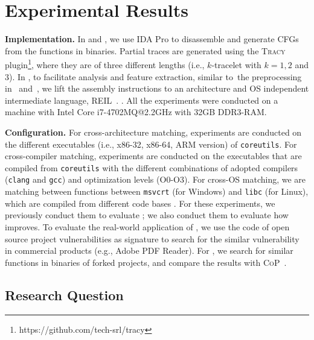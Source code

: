 \section{Experimental Results}\label{sec:experiemntation}



\noindent \textbf{Implementation.} In \tool and \toolNew, we use IDA Pro to disassemble and generate CFGs from the functions in binaries. Partial traces are generated using the \textsc{Tracy} plugin\footnote{https://github.com/tech-srl/tracy}, where they are of three different lengths (i.e., $k$-tracelet with $k=1,2$ and $3$). In \tool, to facilitate analysis and feature extraction, similar to~the preprocessing in~\cite{DBLP:conf/sp/PewnyGGRH15} and~\cite{luo2014semantics}, we lift the assembly instructions to an architecture and OS independent intermediate language, REIL~\cite{dullien2009reil}. . All the experiments were conducted on a machine with Intel Core i7-4702MQ@2.2GHz with 32GB DDR3-RAM.

\vspace{1mm}
\noindent \textbf{Configuration.} For cross-architecture matching, experiments are conducted on the different executables (i.e., x86-32, x86-64, ARM version) of \texttt{coreutils}. For cross-compiler matching, experiments are conducted on the executables that are compiled from \texttt{coreutils} with the different combinations of adopted compilers (\texttt{clang} and \texttt{gcc}) and optimization levels (O0-O3). For cross-OS matching,  we are matching between functions between \texttt{msvcrt} (for Windows) and \texttt{libc} (for Linux), which are compiled from different code bases . For these experiments, we previously conduct them to evaluate \tool; we also conduct them to evaluate how \toolNew improves. To evaluate the real-world application of \tool, we use the code of open source project vulnerabilities as signature to search for the similar vulnerability in commercial products (e.g., Adobe PDF Reader). For \toolNew, we search for similar functions in binaries of forked projects, and compare the results with \textsc{CoP}~\cite{luo2014semantics}.

\subsection{Research Question}\label{sec:evaluation_rq}

